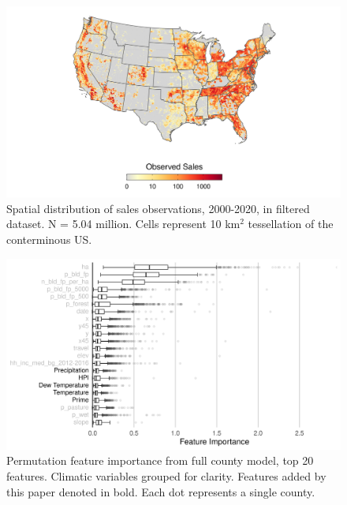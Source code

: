\documentclass[12pt]{article}
\begin{document}
\begin{figure}[H]
    \centering
    \includegraphics[width=1\textwidth]{exhibits/clean_obs_density.png}
    \caption{Spatial distribution of sales observations, 2000-2020, in filtered dataset. N = 5.04 million. Cells represent 10 km$^2$ tessellation of the conterminous US.}
    \label{fig:clean_obs_density}
\end{figure}

\begin{figure}[H]
    \centering
    \includegraphics[width=1\textwidth]{exhibits/fcb_importance_t20.png}
    \caption{Permutation feature importance from full county model, top 20 features. Climatic variables grouped for clarity. Features added by this paper denoted in bold. Each dot represents a single county.}
    \label{fig:fcb_importance}
\end{figure}
\end{document}
